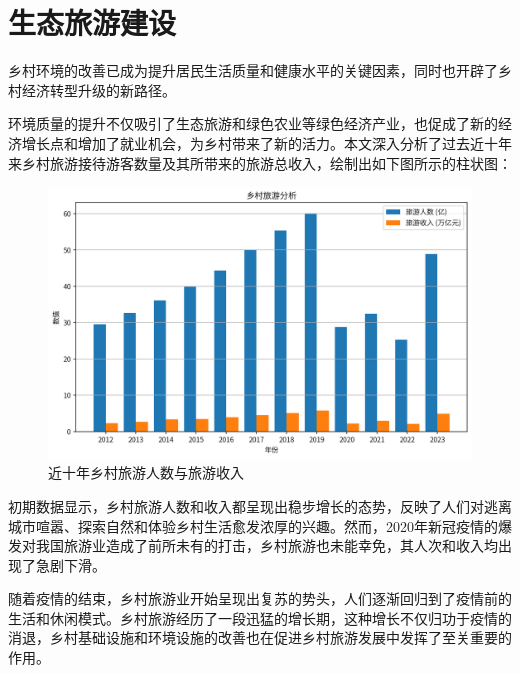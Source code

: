 \section{生态旅游建设}
乡村环境的改善已成为提升居民生活质量和健康水平的关键因素，同时也开辟了乡村经济转型升级的新路径。

环境质量的提升不仅吸引了生态旅游和绿色农业等绿色经济产业，也促成了新的经济增长点和增加了就业机会，为乡村带来了新的活力。本文深入分析了过去近十年来乡村旅游接待游客数量及其所带来的旅游总收入\cite{bisu-rural-tourism-report}，绘制出如下图所示的柱状图：


\begin{figure}[h]
    \centering
    \includegraphics[width=0.65\linewidth]{figures/10.png}
    \caption{近十年乡村旅游人数与旅游收入}
\end{figure}

初期数据显示，乡村旅游人数和收入都呈现出稳步增长的态势，反映了人们对逃离城市喧嚣、探索自然和体验乡村生活愈发浓厚的兴趣。然而，2020年新冠疫情的爆发对我国旅游业造成了前所未有的打击，乡村旅游也未能幸免，其人次和收入均出现了急剧下滑。

随着疫情的结束，乡村旅游业开始呈现出复苏的势头，人们逐渐回归到了疫情前的生活和休闲模式。乡村旅游经历了一段迅猛的增长期，这种增长不仅归功于疫情的消退，乡村基础设施和环境设施的改善也在促进乡村旅游发展中发挥了至关重要的作用。


